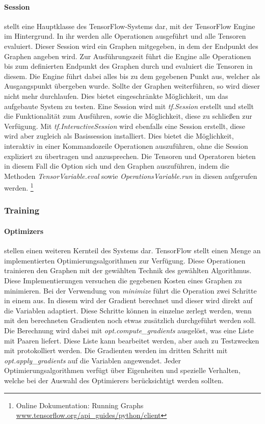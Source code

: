 \paragraph{Session} stellt eine Hauptklasse des TensorFlow-Systems dar, mit der TensorFlow Engine im Hintergrund.
In ihr werden alle Operationen ausgeführt und alle Tensoren evaluiert. 
Dieser Session wird ein Graphen mitgegeben, in dem der Endpunkt des Graphen angeben wird. 
Zur Ausführungszeit führt die Engine alle Operationen bis zum definierten Endpunkt des Graphen durch und evaluiert die Tensoren in diesem. 
Die Engine führt dabei alles bis zu dem gegebenen Punkt aus, welcher als Ausgangspunkt übergeben wurde. 
Sollte der Graphen weiterführen, so wird dieser nicht mehr durchlaufen. 
Dies bietet eingeschränkte Möglichkeit, um das aufgebaute System zu testen. 
Eine Session wird mit \textit{tf.Session} erstellt und stellt die Funktionalität zum Ausführen, sowie die Möglichkeit, diese zu schließen zur Verfügung. 
Mit \textit{tf.InteractiveSession} wird ebenfalls eine Session erstellt, diese wird aber zugleich als Basissession installiert. 
Dies bietet die Möglichkeit, interaktiv in einer Kommandozeile Operationen auszuführen, ohne die Session expliziert zu übertragen und anzusprechen. 
Die Tensoren und Operatoren bieten in diesem Fall die Option sich und den Graphen auszuführen, indem die Methoden \textit{TensorVariable.eval} sowie \textit{OperationsVariable.run} in diesen aufgerufen werden. 
\footnote{Online Dokumentation: Running Graphs \url{www.tensorflow.org/api_guides/python/client}}

\subsubsection{Training}
\label{training}

\paragraph{Optimizers} stellen einen weiteren Kernteil des Systems dar. 
TensorFlow stellt einen Menge an implementierten Optimierungsalgorithmen zur Verfügung. 
Diese Operationen trainieren den Graphen mit der gewählten Technik des gewählten Algorithmus. 
Diese Implementierungen versuchen die gegebenen Kosten eines Graphen zu minimieren. 
Bei der Verwendung von \textit{minimize} führt die Operation zwei Schritte in einem aus. 
In diesem wird der Gradient berechnet und dieser wird direkt auf die Variablen adaptiert. 
Diese Schritte können in einzelne zerlegt werden, wenn mit den berechneten Gradienten noch etwas zusätzlich durchgeführt werden soll. 
Die Berechnung wird dabei mit \textit{opt.compute\_gradients} ausgelöst, was eine Liste mit Paaren liefert. 
Diese Liste kann bearbeitet werden, aber auch zu Testzwecken mit protokolliert werden. 
Die Gradienten werden im dritten Schritt mit \textit{opt.apply\_gradients} auf die Variablen angewendet. 
Jeder Optimierungsalgorithmen verfügt über Eigenheiten und spezielle Verhalten, welche bei der Auswahl des Optimierers berücksichtigt werden sollten.

